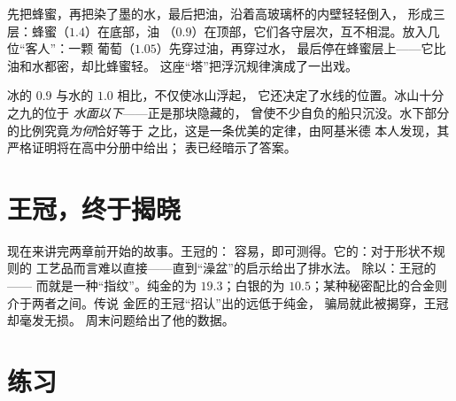 \begin{example}[液体塔]\label{ex:g6:density-floating:tower}
先把蜂蜜，再把染了墨的水，最后把油，沿着高玻璃杯的内壁轻轻倒入，
形成三层：蜂蜜（$1.4$）在底部，油
（$0.9$）在顶部，它们各守层次，互不相混。放入几位“客人”：一颗
葡萄（$1.05$）先穿过油，再穿过水，
最后停在蜂蜜层上——它比油和水都密，却比蜂蜜轻。
这座“塔”把浮沉规律演成了一出戏。
\end{example}

\begin{remark}[读懂冰山]\label{rem:g6:density-floating:iceberg}
冰的 $0.9$ 与水的 $1.0$ 相比，不仅使冰山浮起，
它还决定了水线的位置。冰山十分之九的位于
\emph{水面以下}——正是那块隐藏的，
曾使不少自负的船只沉没。水下部分的比例究竟\emph{为何}恰好等于
之比，这是一条优美的定律，由阿基米德
本人发现，其严格证明将在高中分册中给出；
表已经暗示了答案。
\end{remark}

\section{王冠，终于揭晓}

\begin{example}[阿基米德破案]\label{ex:g6:density-floating:crown}
现在来讲完两章前开始的故事。王冠的：
容易，即可测得。它的：对于形状不规则的
工艺品而言难以直接——直到“澡盆”的启示给出了排水法。
除以：王冠的\emph{}——
而就是一种“指纹”。纯金的为 $19.3$；白银的为
$10.5$；某种秘密配比的合金则介于两者之间。传说
金匠的王冠“招认”出的远低于纯金，
骗局就此被揭穿，王冠却毫发无损。
周末问题给出了他的数据。
\end{example}

\section{练习}

